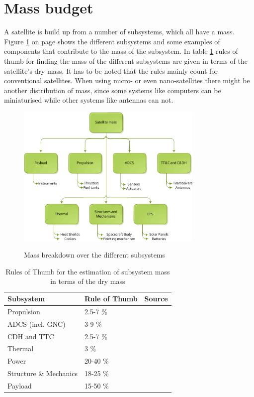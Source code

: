\section{Mass budget}
\label{sect_mass_budget}
A satellite is build up from a number of subsystems, which all have a mass. Figure \ref{massbreakdown} on page \pageref{massbreakdown} shows the different subsystems and some examples of components that contribute to the mass of the subsystem. In table \ref{rotsubsystemmass} rules of thumb for finding the mass of the different subsystems are given in terms of the satellite's dry mass. It has to be noted that the rules mainly count for conventional satellites. When using micro- or even nano-satellites there might be another distribution of mass, since some systems like computers can be miniaturised while other systems like antennas can not. 

\begin{figure} [h]
\centering
\includegraphics[width=0.8\textwidth]{chapters/img/mass_breakdown.png}
\label{massbreakdown}
\caption{Mass breakdown over the different subsystems}
\end{figure}

\begin{table} [h]
\centering
\begin{tabular}{p{10cm} l l}
Subsystem & Rule of Thumb & Source \\ \hline
Propulsion & 2.5-7 \% & \cite{Space2b} \\ 
\ac{ADCS} (incl. \ac{GNC}) & 3-9 \% & \cite{Space2b} \\ 
\ac{CDH} and \ac{TTC} & 2.5-7 \% & \cite{Space2b} \\ 
Thermal & 3 \% & \cite{larson} \\ 
Power & 20-40 \% & \cite{Space2b} \\ 
Structure \& Mechanics & 18-25 \% & \cite{Space2b} \\ 
Payload & 15-50 \% & \cite{larson} 
\end{tabular} 
\caption{Rules of Thumb for the estimation of subsystem mass in terms of the dry mass}
\label{rotsubsystemmass}
\end{table}

